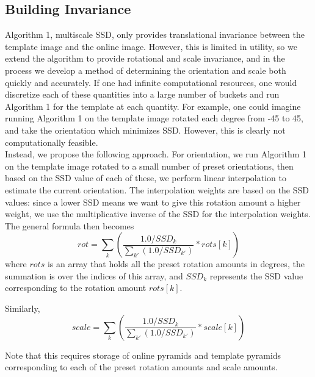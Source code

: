 \documentclass[10pt,twocolumn,letterpaper]{article}
\begin{document}
\subsection*{Building Invariance}
Algorithm 1, multiscale SSD, only provides translational invariance between the
template image and the online image. However, this is limited in utility, so we
extend the algorithm to provide rotational and scale invariance, and in the
process we develop a method of determining the orientation and scale both quickly
and accurately. If one had infinite computational resources, one would discretize
each of these quantities into a large number of buckets and run Algorithm 1 for
the template at each quantity. For example, one could imagine running Algorithm 1 on the template
image rotated each degree from -45 to 45, and take the orientation which minimizes SSD.
However, this is clearly not computationally feasible.\\

Instead, we propose the following approach. For orientation, we run Algorithm 1
on the template image rotated to a small number of preset orientations, then based on the SSD value
of each of these, we perform linear interpolation to estimate the current orientation.
The interpolation weights are based on the SSD values: since a lower SSD means we want
to give this rotation amount a higher weight, we use the multiplicative inverse of the
SSD for the interpolation weights. The general formula then becomes
$$rot = \displaystyle\sum_{k}(\dfrac{1.0 / SSD_{k}}{\sum_{k'}(1.0 / SSD_{k'})} * rots[k])$$
where $rots$ is an array that holds all the preset rotation amounts in degrees,
the summation is over the indices of this array, and $SSD_{k}$ represents the SSD value
corresponding to the rotation amount $rots[k]$.

Similarly,
$$scale = \displaystyle\sum_{k}(\dfrac{1.0 / SSD_{k}}{\sum_{k'}(1.0 / SSD_{k'})} * scale[k])$$

Note that this requires storage of online pyramids and template pyramids corresponding
to each of the preset rotation amounts and scale amounts.
\end{document}

